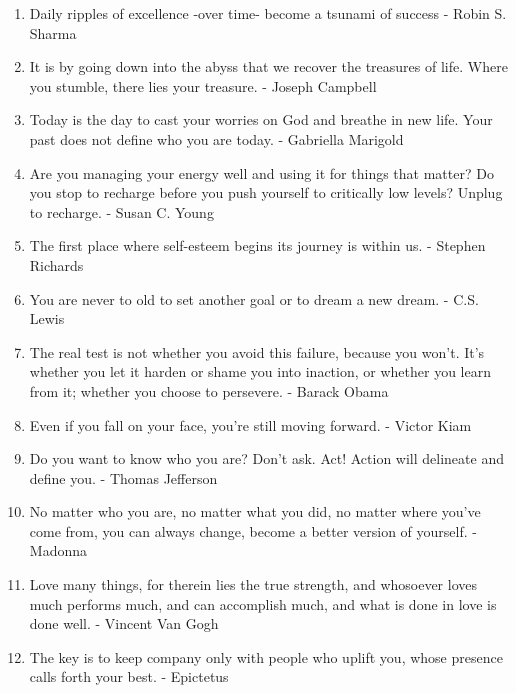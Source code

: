 \begin{enumerate}
            \item Daily ripples of excellence -over time- become a tsunami of success - Robin S. Sharma

            \item It is by going down into the abyss that we recover the treasures of life. Where you stumble, there lies your treasure. - Joseph Campbell

            \item Today is the day to cast your worries on God and breathe in new life. Your past does not define who you are today. - Gabriella Marigold

            \item Are you managing your energy well and using it for things that matter? Do you stop to recharge before you push yourself to critically low levels? Unplug to recharge. - Susan C. Young

            \item The first place where self-esteem begins its journey is within us. - Stephen Richards

            \item You are never to old to set another goal or to dream a new dream. - C.S. Lewis

            \item The real test is not whether you avoid this failure, because you won’t. It’s whether you let it harden or shame you into inaction, or whether you learn from it; whether you choose to persevere. - Barack Obama

            \item Even if you fall on your face, you’re still moving forward. - Victor Kiam

            \item Do you want to know who you are? Don’t ask. Act! Action will delineate and define you. - Thomas Jefferson

            \item No matter who you are, no matter what you did, no matter where you’ve come from, you can always change, become a better version of yourself. - Madonna

            \item Love many things, for therein lies the true strength, and whosoever loves much performs much, and can accomplish much, and what is done in love is done well. - Vincent Van Gogh

            \item The key is to keep company only with people who uplift you, whose presence calls forth your best. - Epictetus
        \end{enumerate}

